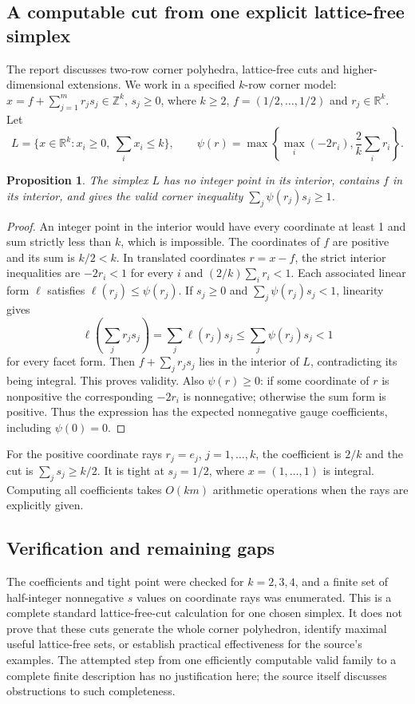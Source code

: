 \documentclass[11pt]{article}
\newtheorem{proposition}{Proposition}
\begin{document}
\subsection{A computable cut from one explicit lattice-free simplex}
The report discusses two-row corner polyhedra, lattice-free cuts and higher-dimensional extensions. We work in a specified $k$-row corner model: $x=f+\sum_{j=1}^m r_js_j\in\mathbb Z^k$, $s_j\ge0$, where $k\ge2$, $f=(1/2,\ldots,1/2)$ and $r_j\in\mathbb R^k$. Let
\[
L=\{x\in\mathbb R^k:x_i\ge0,\ \sum_i x_i\le k\},\qquad
\psi(r)=\max\left\{\max_i(-2r_i),\frac2k\sum_i r_i\right\}.
\]
\begin{proposition}
The simplex $L$ has no integer point in its interior, contains $f$ in its interior, and gives the valid corner inequality $\sum_j\psi(r_j)s_j\ge1$.
\end{proposition}
\begin{proof}
An integer point in the interior would have every coordinate at least 1 and sum strictly less than $k$, which is impossible. The coordinates of $f$ are positive and its sum is $k/2<k$. In translated coordinates $r=x-f$, the strict interior inequalities are $-2r_i<1$ for every $i$ and $(2/k)\sum_i r_i<1$. Each associated linear form $\ell$ satisfies $\ell(r_j)\le\psi(r_j)$. If $s_j\ge0$ and $\sum_j\psi(r_j)s_j<1$, linearity gives
\[
\ell\left(\sum_jr_js_j\right)=\sum_j\ell(r_j)s_j\le\sum_j\psi(r_j)s_j<1
\]
for every facet form. Then $f+\sum_jr_js_j$ lies in the interior of $L$, contradicting its being integral. This proves validity. Also $\psi(r)\ge0$: if some coordinate of $r$ is nonpositive the corresponding $-2r_i$ is nonnegative; otherwise the sum form is positive. Thus the expression has the expected nonnegative gauge coefficients, including $\psi(0)=0$.
\end{proof}
For the positive coordinate rays $r_j=e_j$, $j=1,\ldots,k$, the coefficient is $2/k$ and the cut is $\sum_js_j\ge k/2$. It is tight at $s_j=1/2$, where $x=(1,\ldots,1)$ is integral. Computing all coefficients takes $O(km)$ arithmetic operations when the rays are explicitly given.
\subsection{Verification and remaining gaps}
The coefficients and tight point were checked for $k=2,3,4$, and a finite set of half-integer nonnegative $s$ values on coordinate rays was enumerated. This is a complete standard lattice-free-cut calculation for one chosen simplex. It does not prove that these cuts generate the whole corner polyhedron, identify maximal useful lattice-free sets, or establish practical effectiveness for the source's examples. The attempted step from one efficiently computable valid family to a complete finite description has no justification here; the source itself discusses obstructions to such completeness.
\end{document}
